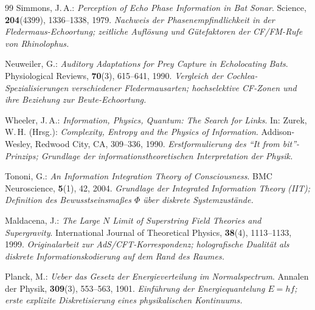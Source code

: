 ﻿\documentclass[12pt,a4paper,titlepage]{report}
\begin{document}
\begin{thebibliography}{99}
Simmons, J.\,A.:
\textit{Perception of Echo Phase Information in Bat Sonar}.
Science, \textbf{204}(4399), 1336--1338, 1979.
\newline\textit{Nachweis der Phasenempfindlichkeit in der Fledermaus-Echoortung;
zeitliche Auflösung und Gütefaktoren der CF/FM-Rufe von \textit{Rhinolophus}.}

Neuweiler, G.:
\textit{Auditory Adaptations for Prey Capture in Echolocating Bats}.
Physiological Reviews, \textbf{70}(3), 615--641, 1990.
\newline\textit{Vergleich der Cochlea-Spezialisierungen verschiedener Fledermausarten;
hochselektive CF-Zonen und ihre Beziehung zur Beute-Echoortung.}

Wheeler, J.\,A.:
\textit{Information, Physics, Quantum: The Search for Links}.
In: Zurek, W.\,H. (Hrsg.): \textit{Complexity, Entropy and the Physics of
Information}. Addison-Wesley, Redwood City, CA, 309--336, 1990.
\newline\textit{Erstformulierung des ``It from bit''-Prinzips; Grundlage der
informationstheoretischen Interpretation der Physik.}

Tononi, G.:
\textit{An Information Integration Theory of Consciousness}.
BMC Neuroscience, \textbf{5}(1), 42, 2004.
\newline\textit{Grundlage der Integrated Information Theory (IIT); Definition
des Bewusstseinsmaßes $\Phi$ über diskrete Systemzustände.}

Maldacena, J.:
\textit{The Large $N$ Limit of Superstring Field Theories and Supergravity}.
International Journal of Theoretical Physics, \textbf{38}(4), 1113--1133, 1999.
\newline\textit{Originalarbeit zur AdS/CFT-Korrespondenz; holografische
Dualität als diskrete Informationskodierung auf dem Rand des Raumes.}

Planck, M.:
\textit{Ueber das Gesetz der Energieverteilung im Normalspectrum}.
Annalen der Physik, \textbf{309}(3), 553--563, 1901.
\newline\textit{Einführung der Energiequantelung $E = hf$; erste explizite
Diskretisierung eines physikalischen Kontinuums.}

\end{thebibliography}
\end{document}
